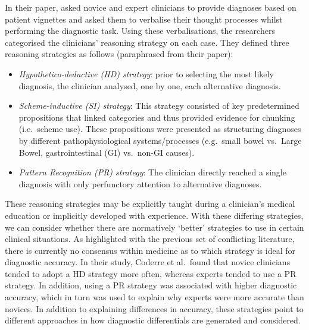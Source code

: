 \documentclass[a4paper, nobind]{templates/ociamthesis}
\begin{document}
\hfill\break
In their paper, \textcite{coderre_diagnostic_2003} asked novice and expert clinicians to provide diagnoses based on patient vignettes and asked them to verbalise their thought processes whilst performing the diagnostic task. Using these verbalisations, the researchers categorised the clinicians' reasoning strategy on each case. They defined three reasoning strategies as follows (paraphrased from their paper):

\begin{itemize}
\item
  \emph{Hypothetico-deductive (HD) strategy}: prior to selecting the most likely diagnosis, the clinician analysed, one by one, each alternative diagnosis.
\item
  \emph{Scheme-inductive (SI) strategy}: This strategy consisted of key predetermined propositions that linked categories and thus provided evidence for chunking (i.e.~scheme use). These propositions were presented as structuring diagnoses by different pathophysiological systems/processes (e.g.~small bowel vs.~Large Bowel, gastrointestinal (GI) vs.~non-GI causes).
\item
  \emph{Pattern Recognition (PR) strategy}: The clinician directly reached a single diagnosis with only perfunctory attention to alternative diagnoses.
\end{itemize}

These reasoning strategies may be explicitly taught during a clinician's medical education or implicitly developed with experience. With these differing strategies, we can consider whether there are normatively `better' strategies to use in certain clinical situations. As highlighted with the previous set of conflicting literature, there is currently no consensus within medicine as to which strategy is ideal for diagnostic accuracy. In their study, Coderre et al.~found that novice clinicians tended to adopt a HD strategy more often, whereas experts tended to use a PR strategy. In addition, using a PR strategy was associated with higher diagnostic accuracy, which in turn was used to explain why experts were more accurate than novices. In addition to explaining differences in accuracy, these strategies point to different approaches in how diagnostic differentials are generated and considered.
\end{document}
